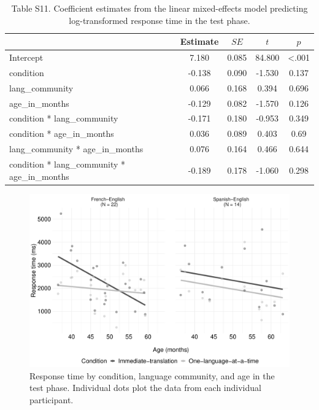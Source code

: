 \documentclass[
  man,floatsintext]{apa7}
\begin{document}
\begin{table}[H]

\begin{center}
\begin{threeparttable}

\caption{\label{tab:unnamed-chunk-33}Table S11. Coefficient estimates from the linear mixed-effects model predicting log-transformed response time in the test phase.}

\begin{tabular}{lcccc}
\toprule
 & Estimate & $SE$ & $t$ & $p$\\
\midrule
Intercept & 7.180 & 0.085 & 84.800 & <.001\\
condition & -0.138 & 0.090 & -1.530 & 0.137\\
lang\_community & 0.066 & 0.168 & 0.394 & 0.696\\
age\_in\_months & -0.129 & 0.082 & -1.570 & 0.126\\
condition * lang\_community & -0.171 & 0.180 & -0.953 & 0.349\\
condition * age\_in\_months & 0.036 & 0.089 & 0.403 & 0.69\\
lang\_community * age\_in\_months & 0.076 & 0.164 & 0.466 & 0.644\\
condition * lang\_community * age\_in\_months & -0.189 & 0.178 & -1.060 & 0.298\\
\bottomrule
\end{tabular}

\end{threeparttable}
\end{center}

\end{table}

\begin{figure}

{\centering \includegraphics[width=0.9\linewidth]{TabletSwitch_supplemental_files/figure-latex/FigureS7-1} 

}

\caption{Response time by condition, language community, and age in the test phase. Individual dots plot the data from each individual participant.}\label{fig:FigureS7}
\end{figure}
\end{document}
